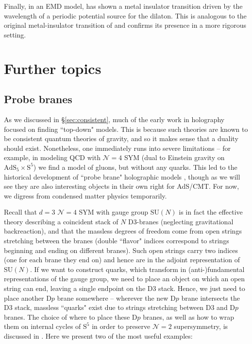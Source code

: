 \documentclass[10pt, oneside]{book}
\begin{document}
\begin{doublespace}
Finally, in an EMD model, \cite{Rangamani:2015hka} has shown a metal insulator transition driven by the wavelength of a periodic potential source for the dilaton.   This is analogous to the original metal-insulator transition of \cite{Donos:2012js} and confirms its presence in a more rigorous setting.

\section{Further topics}


\subsection{Probe branes}\label{sec:probebrane}

As we discussed in \S \ref{sec:consistent}, much of the early work in holography focused on finding ``top-down" models.   This is because such theories are known to be consistent quantum theories of gravity, and so it makes sense that a duality should exist.   Nonetheless, one immediately runs into severe limitations -- for example, in modeling QCD with $\mathcal{N}=4$ SYM (dual to Einstein gravity on $\mathrm{AdS}_5\times \mathrm{S}^5$) we find a model of gluons,  but without any quarks.    This led to the historical development of ``probe brane" holographic models \cite{Karch:2002sh},  though as we will see they are also interesting objects in their own right for AdS/CMT.   For now, we digress from condensed matter physics temporarily.

Recall that $d=3$ $\mathcal{N}=4$ SYM with gauge group $\mathrm{SU}(N)$ is in fact the effective theory describing a coincident stack of $N$ D3-branes (neglecting gravitational backreaction), and that the massless degrees of freedom come from open strings stretching between the branes (double ``flavor" indices correspond to strings beginning and ending on different branes).   Such open strings carry two indices (one for each brane they end on) and hence are in the adjoint representation of $\mathrm{SU}(N)$.   If we want to construct quarks, which transform in (anti-)fundamental representations of the gauge group,  we need to place an object on which an open string can end, leaving a single endpoint on the D3 stack.   Hence, we just need to place another D$p$ brane somewhere -- wherever the new D$p$ brane intersects the D3 stack, massless ``quarks" exist due to strings stretching between D3 and D$p$ branes.    The choice of where to place these D$p$ branes, as well as how to wrap them on internal cycles of $\mathrm{S}^5$  in order to preserve $\mathcal{N}=2$ supersymmetry, is discussed in \cite{Karch:2002sh}. Here we present two of the most useful examples: 


\end{doublespace}
\end{document}
